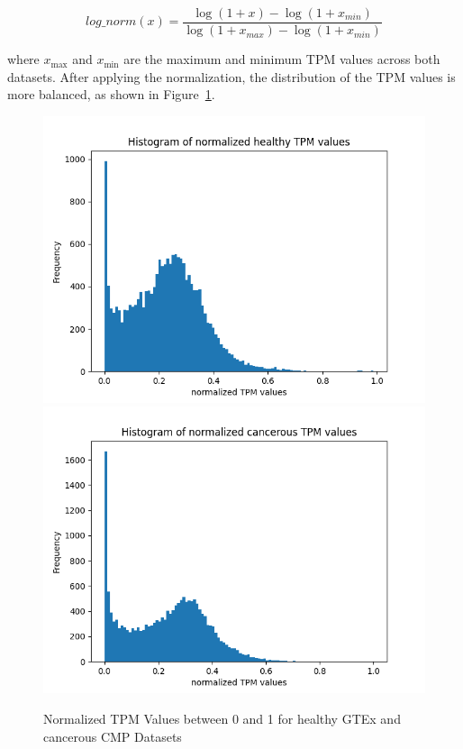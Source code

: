 \begin{equation}
\label{eq:tpm_normalization}
log\_norm(x) = \frac{\log(1 + x) - \log(1 + x_{min})}{\log(1 + x_{max}) - \log(1 + x_{min})}
\end{equation}

where $x_{\max}$ and $x_{\min}$ are the maximum and minimum TPM values across both datasets.
After applying the normalization, the distribution of the TPM values is more balanced, as shown in Figure~\ref{fig:03_02_normalized_tpm_both}.

\begin{figure}[h]
    \includegraphics[width=\linewidth]{figures/03_02_normalized_gtex_tpm}
\endminipage
\hfill
{}
  \includegraphics[width=\linewidth]{figures/03_02_normalized_cmp_tpm}
\endminipage
\caption{Normalized TPM Values between 0 and 1 for healthy GTEx and cancerous CMP Datasets}
\label{fig:03_02_normalized_tpm_both}
\end{figure}


